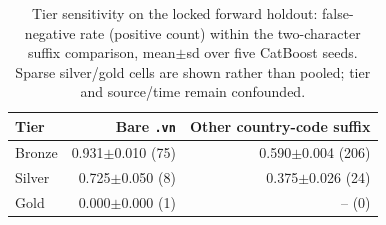 \begin{table}[t]
\centering
\caption{Tier sensitivity on the locked forward holdout: false-negative rate (positive count)
within the two-character suffix comparison, mean$\pm$sd over five CatBoost seeds. Sparse
silver/gold cells are shown rather than pooled; tier and source/time remain confounded.}
\label{tab:tier-sensitivity}
\small
\begin{tabular}{lrr}
\toprule Tier & Bare \texttt{.vn} & Other country-code suffix \\
\midrule
Bronze & 0.931$\pm$0.010 (75) & 0.590$\pm$0.004 (206) \\
Silver & 0.725$\pm$0.050 (8) & 0.375$\pm$0.026 (24) \\
Gold & 0.000$\pm$0.000 (1) & -- (0) \\
\bottomrule
\end{tabular}
\end{table}
